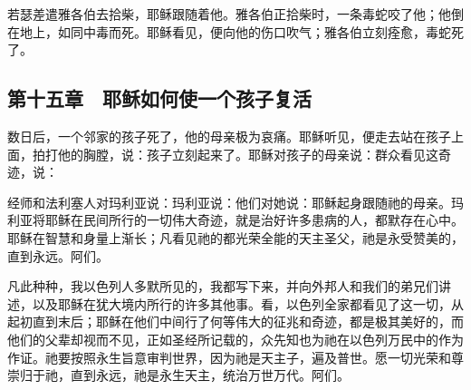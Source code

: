若瑟差遣雅各伯去拾柴，耶稣跟随着他。雅各伯正拾柴时，一条毒蛇咬了他；他倒在地上，如同中毒而死。耶稣看见，便向他的伤口吹气；雅各伯立刻痊愈，毒蛇死了。\par


\subsection{第十五章　耶稣如何使一个孩子复活}

数日后，一个邻家的孩子死了，他的母亲极为哀痛。耶稣听见，便走去站在孩子上面，拍打他的胸膛，说：孩子立刻起来了。耶稣对孩子的母亲说：群众看见这奇迹，说：\par

经师和法利塞人对玛利亚说：玛利亚说：他们对她说：耶稣起身跟随祂的母亲。玛利亚将耶稣在民间所行的一切伟大奇迹，就是治好许多患病的人，都默存在心中。耶稣在智慧和身量上渐长；凡看见祂的都光荣全能的天主圣父，祂是永受赞美的，直到永远。阿们。\par

凡此种种，我以色列人多默所见的，我都写下来，并向外邦人和我们的弟兄们讲述，以及耶稣在犹大境内所行的许多其他事。看，以色列全家都看见了这一切，从起初直到末后；耶稣在他们中间行了何等伟大的征兆和奇迹，都是极其美好的，而他们的父辈却视而不见，正如圣经所记载的，众先知也为祂在以色列万民中的作为作证。祂要按照永生旨意审判世界，因为祂是天主子，遍及普世。愿一切光荣和尊崇归于祂，直到永远，祂是永生天主，统治万世万代。阿们。\par

